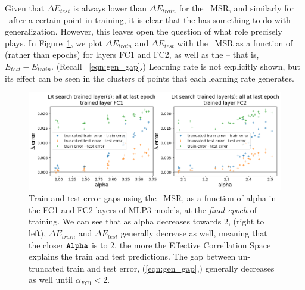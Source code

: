 Given that $\Delta E_{test}$ is always lower than $\Delta E_{train}$ for the \POWERLAW~MSR, and similarly for \TRACELOG~after a certain point in training, it is clear that the \EffectiveCorrelationSpace has something to do with generalization.
However, this leaves open the question of what role precisely \ALPHA plays. 
In Figure~\ref{fig:mlp3-alpha-generalization-gap}, we plot $\Delta E_{train}$ and $\Delta E_{test}$ with the \POWERLAW~MSR as a function of \ALPHA (rather than epochs) for layers FC1 and FC2, as well as the \GeneralizationGap -- that is, $E_{test} - E_{train}$. 
(Recall \EQN~\ref{eqn:gen_gap}.) 
Learning rate is not explicitly shown, but its effect can be seen in the clusters of points that each learning rate generates.

\begin{figure}[t]
  \centering
  \includegraphics[width=12cm]{img/truncated_error/mlp3_trunc_error_by_LR_alpha_all_xmin.png}
  \caption{
        Train and test error gaps using the \POWERLAW~MSR, as a function of alpha in the FC1 and FC2 layers of MLP3 
        models, at the \emph{final epoch} of training. We can see that as alpha decreases towards $2$, (right to left), 
        $\Delta E_{train}$ and $\Delta E_{test}$ generally decrease as well, meaning that the closer $\texttt{Alpha}$ is to $2$, 
        the more the Effective Correllation Space explains the train and test predictions. The gap between un-truncated 
        train and test error, (\EQN \ref{eqn:gen_gap},) generally decreases as well until $\alpha_{FC1} < 2$.
  }
  \label{fig:mlp3-alpha-generalization-gap}
\end{figure}

